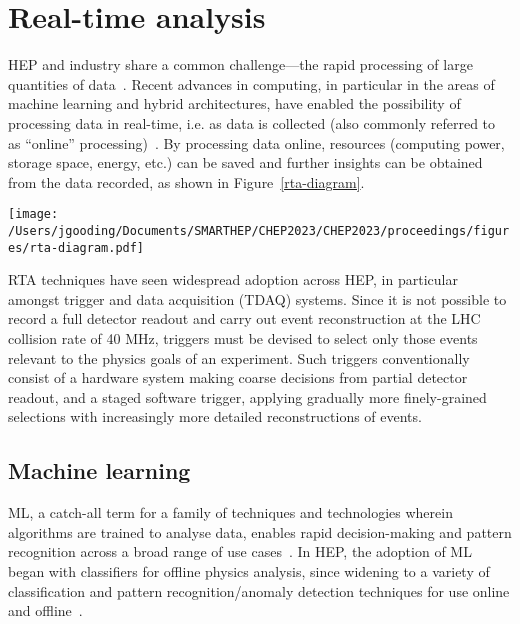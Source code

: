 \section{Real-time analysis}
\label{rta}
HEP and industry share a common challenge—the rapid processing of large quantities of data~\cite{hu-big-data}. Recent advances in computing, in particular in the areas of machine learning and hybrid architectures, have enabled the possibility of processing data in real-time, i.e. as data is collected (also commonly referred to as ``online'' processing)~\cite{real-time-computing}. By processing data online, resources (computing power, storage space, energy, etc.) can be saved and further insights can be obtained from the data recorded, as shown in Figure~\ref{rta-diagram}.

\begin{figure*}[h!]
    \centering
    \texttt{[image: /Users/jgooding/Documents/SMARTHEP/CHEP2023/CHEP2023/proceedings/figures/rta-diagram.pdf]}
    \caption{Traditional and RTA approaches to data processing. Traditional approaches rely on recording all data and processing this offline; in RTA, data is processed as it is produced, recording only the relevant portions, enabling greater volumes of processed data to be stored.}
    \label{rta-diagram}
\end{figure*}

RTA techniques have seen widespread adoption across HEP, in particular amongst trigger and data acquisition (TDAQ) systems. Since it is not possible to record a full detector readout and carry out event reconstruction at the LHC collision rate of {40}{ MHz}, triggers must be devised to select only those events relevant to the physics goals of an experiment. Such triggers conventionally consist of a hardware system making coarse decisions from partial detector readout, and a staged software trigger, applying gradually more finely-grained selections with increasingly more detailed reconstructions of events.

\subsection{Machine learning}
\label{machine-learning}
ML, a catch-all term for a family of techniques and technologies wherein algorithms are trained to analyse data, enables rapid decision-making and pattern recognition across a broad range of use cases~\cite{intro-ml}. In HEP, the adoption of ML began with classifiers for offline physics analysis, since widening to a variety of classification and pattern recognition/anomaly detection techniques for use online and offline~\cite{albertsson-ml}.

